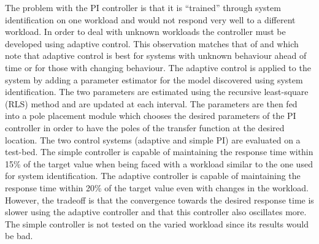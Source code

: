 The problem with the PI controller is that it is ``trained'' through system identification on one workload and would not respond very well to a different workload. In order to deal with unknown workloads the controller must be developed using adaptive control. This observation matches that of \cite{related:control} and \cite{related:control2} which note that adaptive control is best for systems with unknown behaviour ahead of time or for those with changing behaviour. The adaptive control is applied to the system by adding a parameter estimator for the model discovered using system identification. The two parameters are estimated using the recursive least-square (RLS) method and are updated at each interval. The parameters are then fed into a pole placement module which chooses the desired parameters of the PI controller in order to have the poles of the transfer function at the desired location. The two control systems (adaptive and simple PI) are evaluated on a test-bed. The simple controller is capable of maintaining the response time within 15\% of the target value when being faced with a workload similar to the one used for system identification. The adaptive controller is capable of maintaining the response time within 20\% of the target value even with changes in the workload. However, the tradeoff is that the convergence towards the desired response time is slower using the adaptive controller and that this controller also oscillates more. The simple controller is not tested on the varied workload since its results would be bad.

